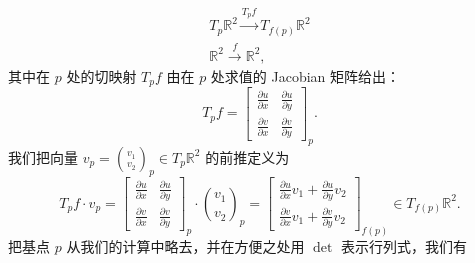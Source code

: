 \[
\begin{gathered}
T_p\mathbb{R}^2\xrightarrow{T_pf}T_{f(p)}\mathbb{R}^2\\
\mathbb{R}^2\xrightarrow{f}\mathbb{R}^2,
\end{gathered}
\]
其中在 $p$ 处的切映射 $T_pf$ 由在 $p$ 处求值的 Jacobian 矩阵给出：
\[
T_pf=
\begin{bmatrix}
\frac{\partial u}{\partial x}&\frac{\partial u}{\partial y}\\
\frac{\partial v}{\partial x}&\frac{\partial v}{\partial y}
\end{bmatrix}_p.
\]
我们把向量 $v_p=\binom{v_1}{v_2}_p\in T_p\mathbb{R}^2$ 的前推定义为
\[
T_pf\cdot v_p=
\begin{bmatrix}
\frac{\partial u}{\partial x}&\frac{\partial u}{\partial y}\\
\frac{\partial v}{\partial x}&\frac{\partial v}{\partial y}
\end{bmatrix}_p
\cdot\binom{v_1}{v_2}_p
=
\begin{bmatrix}
\frac{\partial u}{\partial x}v_1+\frac{\partial u}{\partial y}v_2\\
\frac{\partial v}{\partial x}v_1+\frac{\partial v}{\partial y}v_2
\end{bmatrix}_{f(p)}
\in T_{f(p)}\mathbb{R}^2.
\]
把基点 $p$ 从我们的计算中略去，并在方便之处用 $\det$ 表示行列式，我们有
